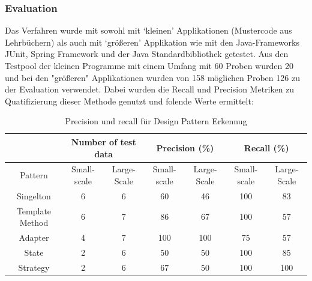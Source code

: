 \documentclass[conference]{IEEEtran}
\begin{document}
\subsubsection*{Evaluation}

Das Verfahren wurde mit sowohl mit `kleinen' Applikationen (Mustercode aus Lehrbüchern) als auch mit `größeren' Applikation wie mit den Java-Frameworks JUnit, Spring Framework und der Java Standardbibliothek getestet.
Aus den Testpool der kleinen Programme mit einem Umfang mit 60 Proben wurden 20 und bei den "größeren" Applikationen wurden von 158 möglichen Proben 126 zu der Evaluation verwendet.
Dabei wurden die Recall und Precision Metriken zu Quatifizierung dieser Methode genutzt und folende Werte ermittelt:

\begin{table}
    \centering
    \caption{Precision und recall für Design Pattern Erkennug}
    \label{table:2}
    \begin{tabular}{|c|c|c|c|c|c|c|}
        \hline
                        & \multicolumn{2}{|c|}{Number of test data} & \multicolumn{2}{|c|}{Precision (\%)} & \multicolumn{2}{|c|}{Recall (\%)}                                           \\
        \hline
        Pattern         & Small-scale                               & Large-Scale                          & Small-scale                       & Large-Scale & Small-scale & Large-Scale \\
        \hline
        Singelton       & 6                                         & 6                                    & 60                                & 46          & 100         & 83          \\
        \hline
        Template Method & 6                                         & 7                                    & 86                                & 67          & 100         & 57          \\
        \hline
        Adapter         & 4                                         & 7                                    & 100                               & 100         & 75          & 57          \\
        \hline
        State           & 2                                         & 6                                    & 50                                & 50          & 100         & 85          \\
        \hline
        Strategy        & 2                                         & 6                                    & 67                                & 50          & 100         & 100         \\
        \hline
    \end{tabular}
\end{table}
\end{document}
